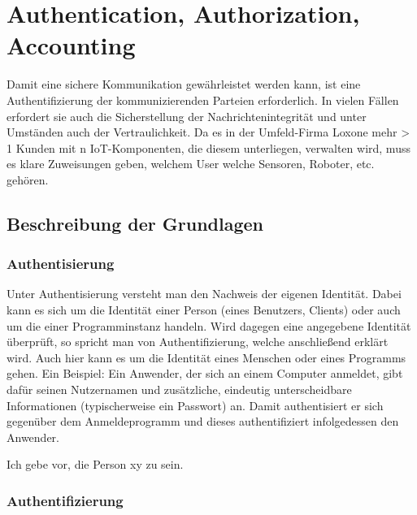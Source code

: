 \documentclass[letterpaper, 12pt]{article}
\let\tempsection\section
\renewcommand\section[1]{\vspace{-0.3cm}\tempsection{#1}\vspace{-0.3cm}}
\let\tempsubsection\subsection
\renewcommand\subsection[1]{\vspace{0cm}\tempsubsection{#1}\vspace{0cm}}
\let\tempsubsubsection\subsubsection
\renewcommand\subsubsection[1]{\vspace{0cm}\tempsubsubsection{#1}\vspace{0cm}}
\begin{document}
\clearpage

\section{Authentication, Authorization, Accounting}

Damit eine sichere Kommunikation gewährleistet werden kann, ist eine Authentifizierung der kommunizierenden Parteien erforderlich. In vielen Fällen erfordert sie auch die Sicherstellung der Nachrichtenintegrität und unter Umständen auch der Vertraulichkeit. Da es in der Umfeld-Firma Loxone mehr > 1 Kunden mit n IoT-Komponenten, die diesem unterliegen, verwalten wird, muss es klare Zuweisungen geben, welchem User welche Sensoren, Roboter, etc. gehören. \cite{ausarbeitungauth}

\subsection{Beschreibung der Grundlagen}

\subsubsection{Authentisierung}

Unter Authentisierung versteht man den Nachweis der eigenen Identität. Dabei kann es sich um die Identität einer Person (eines Benutzers, Clients) oder auch um die einer Programminstanz handeln. Wird dagegen eine angegebene Identität überprüft, so spricht man von Authentifizierung, welche anschließend erklärt wird. Auch hier kann es um die Identität eines Menschen oder eines Programms gehen. Ein Beispiel: Ein Anwender, der sich an einem Computer anmeldet, gibt dafür seinen Nutzernamen und zusätzliche, eindeutig unterscheidbare Informationen (typischerweise ein Passwort) an. Damit authentisiert er sich gegenüber dem Anmeldeprogramm und dieses authentifiziert infolgedessen den Anwender. \cite{ausarbeitungauth}

\begin{center}
	Ich gebe vor, die Person xy zu sein.
\end{center}

\subsubsection{Authentifizierung}
\end{document}
